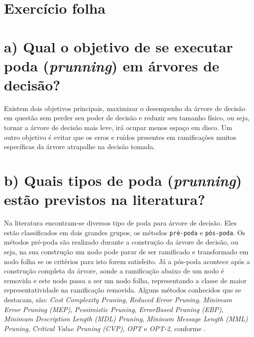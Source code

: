 \documentclass[
    article,            %
    11pt,               %
    oneside,            %
    a4paper,            %
    english,            %
    brazil,             %
    sumario=tradicional,
    ]{abntex2}
\begin{document}
\section*{\textbf{Exercício folha}}

\section*{\textbf{a) Qual o objetivo de se executar poda (\textit{prunning}) em árvores de decisão?}}

Existem dois objetivos principais, maximizar o desempenho da árvore de decisão em questão sem perder seu poder de decisão e reduzir seu tamanho físico, ou seja, tornar a árvore de decisão mais leve, irá ocupar menos espaço em disco. Um outro objetivo é evitar que os erros e ruídos presentes em ramificações muitos específicas da árvore atrapalhe na decisão tomada.

\section*{\textbf{b) Quais tipos de poda (\textit{prunning}) estão previstos na literatura?}}

Na literatura encontram-se diversos tipo de poda para árvore de decisão. Eles estão classificados em dois grandes grupos, os métodos \texttt{pré-poda} e \texttt{pós-poda}. Os métodos pré-poda são realizado durante a construção da árvore de decisão, ou seja, na sua construção um nodo pode parar de ser ramificado e transformado em nodo folha se os critérios para isto forem satisfeito. Já a pós-poda acontece após a construção completa da árvore, aonde a ramificação abaixo de um nodo é removida e este nodo passa a ser um nodo folha, representando a classe de maior representatividade na ramificação removida. Alguns métodos conhecidos que se destacam, são: \textit{Cost Complexity Pruning}, \textit{Reduced Error Pruning}, \textit{Minimum Error Pruning (MEP)}, \textit{Pessimistic Pruning}, \textit{ErrorBased Pruning (EBP)}, \textit{Minimum Description Length (MDL) Pruning}, \textit{Mininum Message Length (MML) Pruning}, \textit{Critical Value Pruning (CVP)}, \textit{OPT} e \textit{OPT-2}, conforme .  
\end{document}
